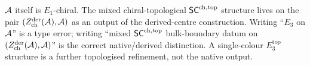 \begin{remark}%
\label{rem:chd-native-vs-derived}%
%
$\mathcal{A}$ itself is $E_1$-chiral. The mixed chiral-topological
$\mathsf{SC}^{\mathrm{ch},\mathrm{top}}$ structure lives on the pair
$(Z^{\mathrm{der}}_{\mathrm{ch}}(\mathcal{A}),\mathcal{A})$ as an output of the
derived-centre construction. Writing ``$E_3$ on $\mathcal{A}$'' is a type
error; writing ``mixed $\mathsf{SC}^{\mathrm{ch},\mathrm{top}}$ bulk-boundary datum on
$(Z^{\mathrm{der}}_{\mathrm{ch}}(\mathcal{A}),\mathcal{A})$'' is the correct
native/derived distinction. A single-colour $E_3^{\mathrm{top}}$
structure is a further topologised refinement, not the native output.
\end{remark}


